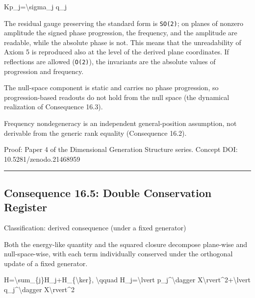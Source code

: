 \documentclass[
  a4paper,
]{article}
\newenvironment{Shaded}{}{}
\newcommand{\NormalTok}[1]{#1}
\begin{document}
\begin{Shaded}
\begin{Highlighting}[]
\NormalTok{Kp\_j=\textbackslash{}sigma\_j q\_j}
\end{Highlighting}
\end{Shaded}

The residual gauge preserving the standard form is \texttt{SO(2)}; on
planes of nonzero amplitude the signed phase progression, the frequency,
and the amplitude are readable, while the absolute phase is not. This
means that the unreadability of Axiom 5 is reproduced also at the level
of the derived plane coordinates. If reflections are allowed
(\texttt{O(2)}), the invariants are the absolute values of progression
and frequency.

The null-space component is static and carries no phase progression, so
progression-based readouts do not hold from the null space (the
dynamical realization of Consequence 16.3).

Frequency nondegeneracy is an independent general-position assumption,
not derivable from the generic rank equality (Consequence 16.2).

Proof: Paper 4 of the Dimensional Generation Structure series. Concept
DOI: 10.5281/zenodo.21468959

\begin{center}\rule{0.5\linewidth}{0.5pt}\end{center}

\subsection{Consequence 16.5: Double Conservation
Register}\label{consequence-16.5-double-conservation-register}

Classification: derived consequence (under a fixed generator)

Both the energy-like quantity and the squared closure decompose
plane-wise and null-space-wise, with each term individually conserved
under the orthogonal update of a fixed generator.

\begin{Shaded}
\begin{Highlighting}[]
\NormalTok{H=\textbackslash{}sum\_\{j\}H\_j+H\_\{\textbackslash{}ker\},}
\NormalTok{\textbackslash{}qquad}
\NormalTok{H\_j=\textbackslash{}lvert p\_j\^{}\textbackslash{}dagger X\textbackslash{}rvert\^{}2+\textbackslash{}lvert q\_j\^{}\textbackslash{}dagger X\textbackslash{}rvert\^{}2}
\end{Highlighting}
\end{Shaded}
\end{document}
